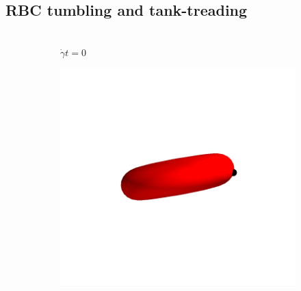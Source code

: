 \subsection{RBC tumbling and tank-treading}

\begin{figure}[thb]
    \centering
    \begin{subfigure}{\textwidth}
    \begin{minipage}{0.2\textwidth}
        \centering
        \\
        $\dot{\gamma}t = 0$
    \end{minipage}%
    \begin{minipage}{0.2\textwidth}
        \centering
        \includegraphics[trim=75 100 75 100, clip, width=\textwidth]{figures/tumble1000.png}\\

\end{minipage}
\end{subfigure}
\end{figure}
